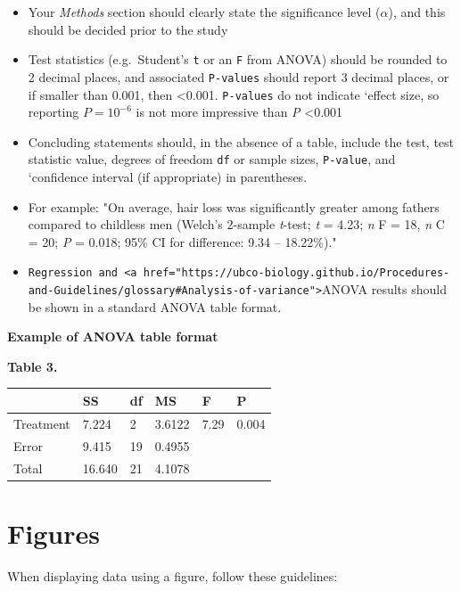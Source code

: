 \documentclass[
]{book}
\begin{document}
\begin{itemize}
\item
  Your \emph{Methods} section should clearly state the significance level (\(\alpha\)), and this should be decided prior to the study
\item
  Test statistics (e.g.~Student's \texttt{t} or an \texttt{F} from ANOVA) should be rounded to 2 decimal places, and associated \texttt{P-values} should report 3 decimal places, or if smaller than 0.001, then \textless0.001. \texttt{P-values} do not indicate `effect size, so reporting \(P = 10^{-6}\) is not more impressive than \emph{P} \textless0.001
\item
  Concluding statements should, in the absence of a table, include the test, test statistic value, degrees of freedom \texttt{df} or sample sizes, \texttt{P-value}, and `confidence interval (if appropriate) in parentheses.
\item
  For example: "On average, hair loss was significantly greater among fathers compared to childless men (Welch's 2-sample \emph{t}-test; \emph{t} = 4.23; \emph{n} F = 18, \emph{n} C = 20; \emph{P} = 0.018; 95\% CI for difference: 9.34 -- 18.22\%)."\\
\item
  \texttt{Regression\ and\ \textless{}a\ href="https://ubco-biology.github.io/Procedures-and-Guidelines/glossary\#Analysis-of-variance"\textgreater{}}ANOVA results should be shown in a standard ANOVA table format.
\end{itemize}

\textbf{Example of ANOVA table format}

\textbf{Table 3.}

\begin{longtable}[]{@{}llllll@{}}
\toprule
& SS & df & MS & F & P \\
\midrule
\endhead
Treatment & 7.224 & 2 & 3.6122 & 7.29 & 0.004 \\
Error & 9.415 & 19 & 0.4955 & & \\
Total & 16.640 & 21 & 4.1078 & & \\
\bottomrule
\end{longtable}

\hypertarget{figures}{%
\section{Figures}\label{figures}}

When displaying data using a figure, follow these guidelines:
\end{document}
